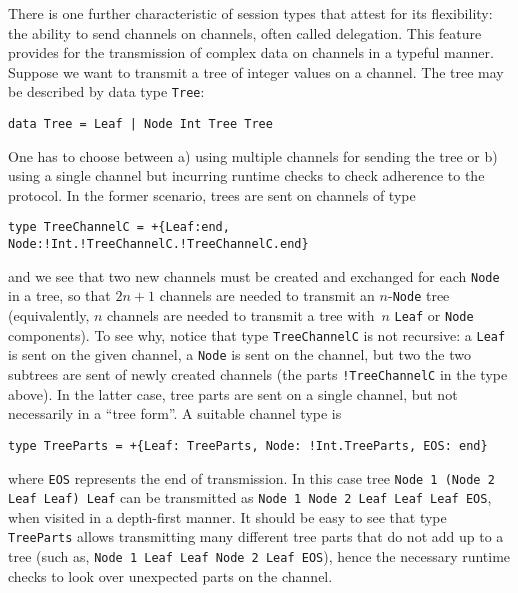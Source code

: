 There is one further characteristic of session types that attest for
its flexibility: the ability to send channels on channels, often
called delegation. This feature provides for the transmission of
complex data on channels in a typeful manner. Suppose we want to
transmit a tree of integer values on a channel. The tree may be
described by data type \lstinline|Tree|:
%
\begin{lstlisting}
data Tree = Leaf | Node Int Tree Tree
\end{lstlisting}

One has to choose between a) using multiple channels for
sending the tree or b) using a single channel but incurring runtime
checks to check adherence to the protocol. In the former scenario,
trees are sent on channels of type
%
\begin{lstlisting}[morekeywords=end]
type TreeChannelC = +{Leaf:end, Node:!Int.!TreeChannelC.!TreeChannelC.end}
\end{lstlisting}
%
and we see that two new channels must be created and exchanged for
each \lstinline|Node| in a tree, so that $2n+1$ channels are needed to
transmit an $n$-\lstinline|Node| tree (equivalently, $n$ channels are
needed to transmit a tree with~$n$ \lstinline|Leaf| or
\lstinline|Node| components).
%
To see why, notice that type \lstinline|TreeChannelC| is not
recursive: a \lstinline|Leaf| is sent on the given channel, a
\lstinline|Node| is sent on the channel, but two the two subtrees are
sent of newly created channels (the parts \lstinline|!TreeChannelC| in
the type above).
%
In the latter case, tree parts are sent on a single channel, but not
necessarily in a ``tree form''. A suitable channel type is
%
\begin{lstlisting}[morekeywords=end]
type TreeParts = +{Leaf: TreeParts, Node: !Int.TreeParts, EOS: end}
\end{lstlisting}
%
where \lstinline|EOS| represents the end of transmission. In this case
tree \lstinline|Node 1 (Node 2 Leaf Leaf) Leaf| can be transmitted as
\lstinline|Node 1 Node 2 Leaf Leaf Leaf EOS|, when visited in a
depth-first manner. It should be easy to see that type
\lstinline|TreeParts| allows transmitting many different tree parts
that do not add up to a tree (such as,
%
\lstinline|Node 1 Leaf Leaf Node 2 Leaf EOS|), hence the necessary
runtime checks to look over unexpected parts on the channel.

